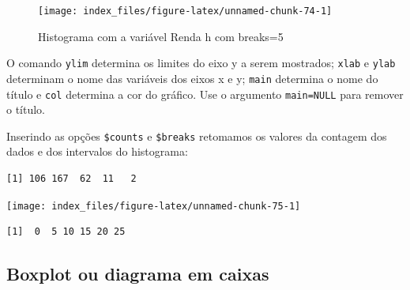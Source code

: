 \documentclass[12pt,portuguese,oneside]{book}
\newenvironment{Shaded}{\begin{snugshade}}{\end{snugshade}}
\newcommand{\KeywordTok}[1]{\textcolor[rgb]{0.13,0.29,0.53}{\textbf{#1}}}
\newcommand{\DataTypeTok}[1]{\textcolor[rgb]{0.13,0.29,0.53}{#1}}
\newcommand{\DecValTok}[1]{\textcolor[rgb]{0.00,0.00,0.81}{#1}}
\newcommand{\StringTok}[1]{\textcolor[rgb]{0.31,0.60,0.02}{#1}}
\newcommand{\OperatorTok}[1]{\textcolor[rgb]{0.81,0.36,0.00}{\textbf{#1}}}
\newcommand{\NormalTok}[1]{#1}
\begin{document}
\begin{figure}[H]

{\centering \texttt{[image: index\_files/figure-latex/unnamed-chunk-74-1]} 

}

\caption{Histograma com a variável Renda h com breaks=5}\label{fig:unnamed-chunk-74}
\end{figure}

O comando \texttt{ylim} determina os limites do eixo y a serem
mostrados; \texttt{xlab} e \texttt{ylab} determinam o nome das variáveis
dos eixos x e y; \texttt{main} determina o nome do título e \texttt{col}
determina a cor do gráfico. Use o argumento \texttt{main=NULL} para
remover o título.

Inserindo as opções \texttt{\$counts} e \texttt{\$breaks} retomamos os
valores da contagem dos dados e dos intervalos do histograma:

\begin{Shaded}
\end{Shaded}

\begin{verbatim}
[1] 106 167  62  11   2
\end{verbatim}

\begin{Shaded}
\end{Shaded}

\begin{center}\texttt{[image: index\_files/figure-latex/unnamed-chunk-75-1]} \end{center}

\begin{verbatim}
[1]  0  5 10 15 20 25
\end{verbatim}

\subsection{Boxplot ou diagrama em
caixas}\label{boxplot-ou-diagrama-em-caixas}
\end{document}
